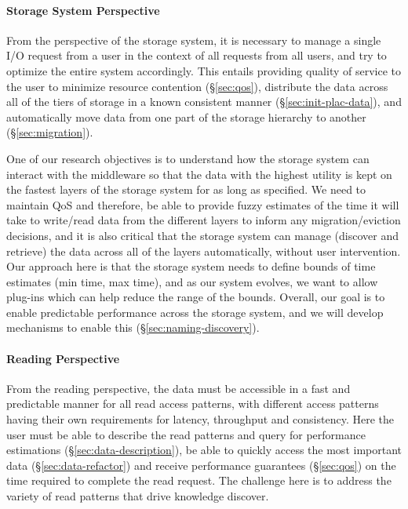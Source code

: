 \paragraph{Storage System Perspective}
\label{subsec:storage-perspective}
From the perspective of the storage system, it is necessary to manage a
single I/O request from a user in the context of all requests from all
users, and try to optimize the entire system accordingly. This entails
providing quality of service to the user to minimize
resource contention (\S\ref{sec:qos}), distribute the data across all of the tiers of storage
in a known consistent manner (\S\ref{sec:init-plac-data}), and automatically move data from one part of
the storage hierarchy to another (\S\ref{sec:migration}). 

One of our research objectives is to understand how the
storage system can interact with the middleware   so
that the data with the highest utility is kept on the fastest layers of the
storage system for as long as specified. We need to maintain 
QoS and therefore, be able to provide fuzzy estimates of the time it will take to write/read data from
the different layers to inform any migration/eviction decisions, and it
is also critical that the storage system can manage (discover and retrieve) the data across all of the
layers automatically, without user intervention. 
Our approach here is that the storage system needs to define bounds of time estimates
(min time, max time), and as our system evolves, we want to allow plug-ins which can help
reduce the range of the bounds.
Overall, our goal is to enable predictable performance across the storage system, and we will develop mechanisms to enable this
(\S\ref{sec:naming-discovery}).



\paragraph{Reading  Perspective}
\label{subsec:reading-perspective}

From the reading perspective, the data must be accessible in a fast and
predictable manner for all read access patterns, with different access
patterns having their own requirements for latency, throughput and
consistency. Here the user must be able to describe the read patterns and
query for performance estimations (\S\ref{sec:data-description}), be able
to quickly access the most important data (\S\ref{sec:data-refactor}) and receive
performance guarantees (\S\ref{sec:qos}) on the time required to complete
the read request. The challenge here is to address the variety of read
patterns that drive knowledge discover. 

